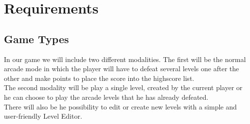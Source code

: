 
\chapter*{Requirements}
\label{chap:reference}

\section*{Game Types}
\label{sec:gametypes}

In our game we will include two different modalities. The first will be the normal arcade mode in which the player will have to defeat several levels one after the other and make points to place the score into the highscore list.\\
The second modality will be play a single level, created by the current player or he can choose to play the arcade levels that he has already defeated.\\
There will also be he possibility to edit or create new levels with a simple and user-friendly Level Editor.\\